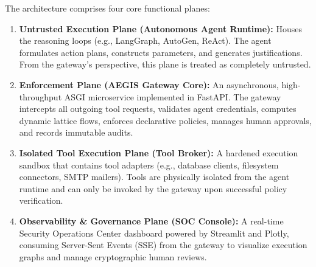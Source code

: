 The architecture comprises four core functional planes:
\begin{enumerate}
    \item \textbf{Untrusted Execution Plane (Autonomous Agent Runtime):} Houses the reasoning loops (e.g., LangGraph, AutoGen, ReAct). The agent formulates action plans, constructs parameters, and generates justifications. From the gateway's perspective, this plane is treated as completely untrusted.
    \item \textbf{Enforcement Plane (AEGIS Gateway Core):} An asynchronous, high-throughput ASGI microservice implemented in FastAPI. The gateway intercepts all outgoing tool requests, validates agent credentials, computes dynamic lattice flows, enforces declarative policies, manages human approvals, and records immutable audits.
    \item \textbf{Isolated Tool Execution Plane (Tool Broker):} A hardened execution sandbox that contains tool adapters (e.g., database clients, filesystem connectors, SMTP mailers). Tools are physically isolated from the agent runtime and can only be invoked by the gateway upon successful policy verification.
    \item \textbf{Observability \& Governance Plane (SOC Console):} A real-time Security Operations Center dashboard powered by Streamlit and Plotly, consuming Server-Sent Events (SSE) from the gateway to visualize execution graphs and manage cryptographic human reviews.
\end{enumerate}

